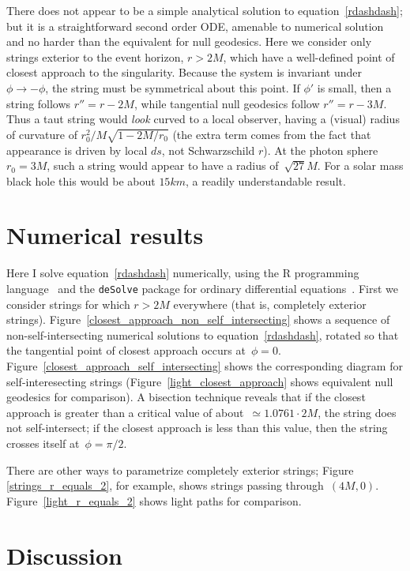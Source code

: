 \documentclass[review]{elsarticle}
\begin{document}
There does not appear to be a simple analytical solution to
equation~\ref{rdashdash}; but it is a straightforward second order
ODE, amenable to numerical solution and no harder than the equivalent
for null geodesics.  Here we consider
only strings exterior to the event horizon, $r>2M$, which have a
well-defined point of closest approach to the singularity.  Because
the system is invariant under~$\phi\longrightarrow-\phi$, the string
must be symmetrical about this point.  If $\phi'$ is small, then a
string follows $r''=r-2M$, while tangential null geodesics follow
$r''=r-3M$.  Thus a taut string would {\em look} curved to a local
observer, having a (visual) radius of curvature of
$r_0^2/M\sqrt{1-2M/r_0}$ (the extra term comes from the fact that
appearance is driven by local $ds$, not Schwarzschild $r$).  At the
photon sphere $r_0=3M$, such a string would appear to have a radius
of~$\sqrt{27}M$.  For a solar mass black hole this would be about
$15\unit{km}$, a readily understandable result.


\section{Numerical results}

Here I solve equation~\ref{rdashdash} numerically, using the R
programming language~\cite{rcore2019} and the \verb+deSolve+ package
for ordinary differential equations~\cite{soetart2010}.  First we
consider strings for which $r>2M$ everywhere (that is, completely
exterior strings).
Figure~\ref{closest_approach_non_self_intersecting} shows a sequence
of non-self-intersecting numerical solutions to
equation~\ref{rdashdash}, rotated so that the tangential point of
closest approach occurs at~$\phi=0$.
Figure~\ref{closest_approach_self_intersecting} shows the
corresponding diagram for self-interesecting strings
(Figure~\ref{light_closest_approach} shows equivalent null geodesics
for comparison).  A bisection technique reveals that if the closest
approach is greater than a critical value of about~$\simeq 1.0761\cdot
2M$, the string does not self-intersect; if the closest approach is
less than this value, then the string crosses itself at~$\phi=\pi/2$.

There are other ways to parametrize completely exterior strings;
Figure \ref{strings_r_equals_2}, for example, shows strings passing
through~$(4M,0)$.  Figure~\ref{light_r_equals_2} shows light paths for
comparison.

\section{Discussion}
\end{document}
